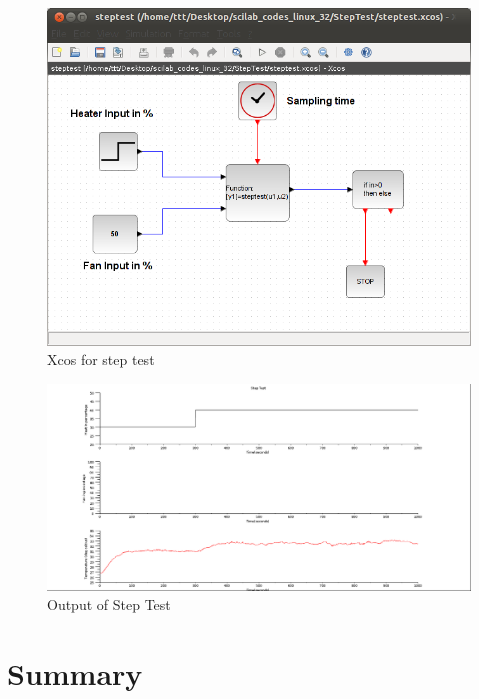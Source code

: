\begin{figure}
\centering
\includegraphics[width=0.7\linewidth]{vlabs/step-xcos.png}
\caption{Xcos for step test}
\label{step-xcos}
\end{figure}

\begin{figure}
\centering
\includegraphics[width=0.7\linewidth]{vlabs/step-test-output.png}
\caption{Output of Step Test}
\label{step-plot}
\end{figure}

\section{Summary}\label{virtual-summary}

